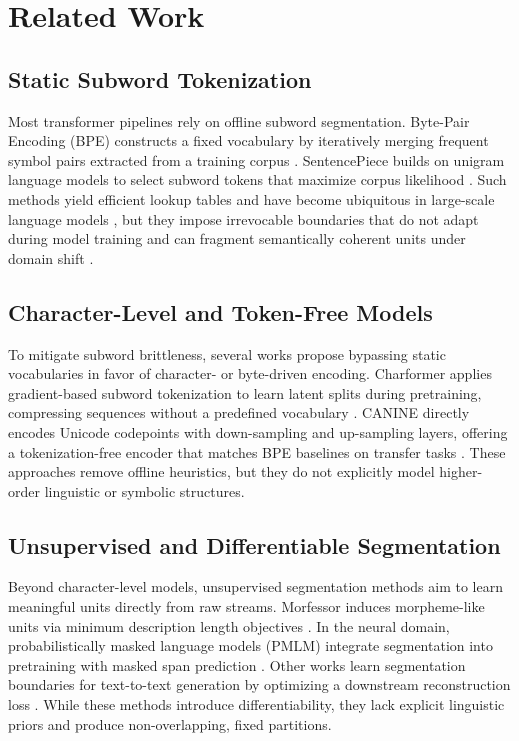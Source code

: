 \section{Related Work}

\subsection{Static Subword Tokenization}
Most transformer pipelines rely on offline subword segmentation. Byte-Pair Encoding (BPE) constructs a fixed vocabulary by iteratively merging frequent symbol pairs extracted from a training corpus \cite{sennrich2016bpe}. SentencePiece builds on unigram language models to select subword tokens that maximize corpus likelihood \cite{kudo2018sentencepiece}. Such methods yield efficient lookup tables and have become ubiquitous in large-scale language models \cite{vaswani2017attention, devlin2019bert}, but they impose irrevocable boundaries that do not adapt during model training and can fragment semantically coherent units under domain shift \cite{galle2021respite}.

\subsection{Character-Level and Token-Free Models}
To mitigate subword brittleness, several works propose bypassing static vocabularies in favor of character- or byte-driven encoding. Charformer applies gradient-based subword tokenization to learn latent splits during pretraining, compressing sequences without a predefined vocabulary \cite{taylor2021charformer}. CANINE directly encodes Unicode codepoints with down-sampling and up-sampling layers, offering a tokenization-free encoder that matches BPE baselines on transfer tasks \cite{clark2021canine}. These approaches remove offline heuristics, but they do not explicitly model higher-order linguistic or symbolic structures.

\subsection{Unsupervised and Differentiable Segmentation}
Beyond character-level models, unsupervised segmentation methods aim to learn meaningful units directly from raw streams. Morfessor induces morpheme-like units via minimum description length objectives \cite{creutz2005unsupervised}. In the neural domain, probabilistically masked language models (PMLM) integrate segmentation into pretraining with masked span prediction \cite{liu2022pmlm}. Other works learn segmentation boundaries for text-to-text generation by optimizing a downstream reconstruction loss \cite{liu2022learnedsegmentation}. While these methods introduce differentiability, they lack explicit linguistic priors and produce non-overlapping, fixed partitions.

